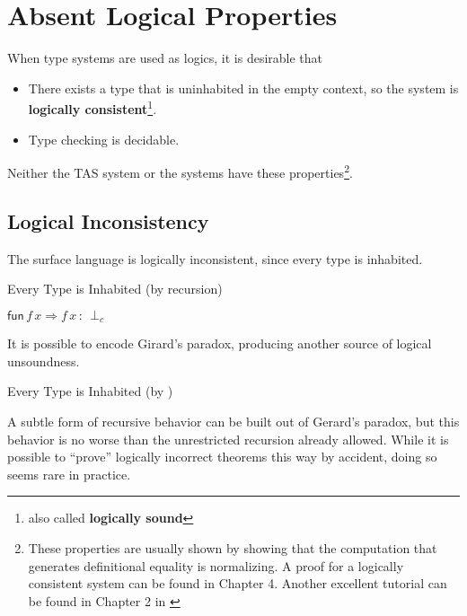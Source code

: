 \section{Absent Logical Properties}
 
When type systems are used as logics, it is desirable that
\begin{itemize}
\item There exists a type that is uninhabited in the empty context, so the system is \textbf{logically consistent}\footnote{also called \textbf{logically sound}}.
\item Type checking is decidable.
\end{itemize}
Neither the \ac{TAS} system or the \Bidir{} systems have these properties\footnote{
 These properties are usually shown by showing that the computation that generates definitional equality is normalizing.
 A proof for a logically consistent system can be found in Chapter 4\cite{luo1994computation}.
 Another excellent tutorial can be found in Chapter 2 in \cite{casinghino2014combiningthesis}}.
 
\subsection{Logical Inconsistency}
 
The surface language is logically inconsistent, since every type is inhabited.
 
\begin{example}
Every Type is Inhabited (by recursion)
 
$\mathsf{fun}\,f\,x\Rightarrow f\,x\,:\,\perp_{c}$
\end{example}
 
It is possible to encode Girard's paradox, producing another source of logical unsoundness.
\begin{example}
Every Type is Inhabited (by \tit{})
 
 
\end{example}
 
A subtle form of recursive behavior can be built out of Gerard's paradox\cite{Reinhold89typecheckingis}, but this behavior is no worse than the unrestricted recursion already allowed.
While it is possible to ``prove'' logically incorrect theorems this way by accident, doing so seems rare in practice.
 
